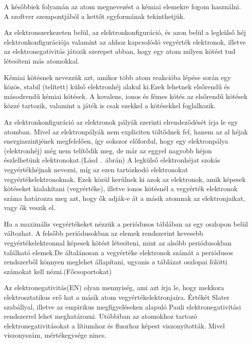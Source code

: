\documentclass[colorlinks]{thesis-ekf}
\theoremstyle{definition}
\theoremstyle{remark}
\begin{document}
A későbbiek folyamán az atom megnevezést a kémiai elemekre fogom használni. A szoftver szempontjából a kettőt egyformának tekinthetjük.

Az elektronszerkezeten belül, az elektronkonfiguráció, és azon belül a legkülső héj elektronkonfigurációja valamint az ahhoz kapcsolódó vegyérték elektronok, illetve az elektronegativitás játszik szerepet abban, hogy egy atom milyen kötést tud létesíteni más atomokkal. 

Kémiai kötésnek nevezzük azt, amikor több atom reakcióba lépése során egy közös, stabil (telített) külső elektronhéj alakul ki.Ezek lehetnek elsőrendű és másodrendű kémiai kötések. A kovalens, ionos és fémes kötés az elsőrendű kötések közzé tartozik\cite{miskolc_kemia}, valamint a játék is csak ezekkel a kötésekkel foglalkozik.

Az elektronkonfiguráció az elektronok pályák szerinti elrendeződését írja le egy atomban.\cite{periodusos_ppt} Mivel az elektronpályák nem expliciten töltődnek fel, hanem az al héjak energiaszintjének megfelelően, így sokszor előfordul, hogy egy elektronpálya (elektronhéj) még nem telítődik meg, de már az eggyel nagyobb héjon észlelhetünk elektronokat.(Lásd .~ábrán)
A legkülső elektronhéjat szokás vegyértékhéjnak nevezni, míg az ezen tartózkodó elektronokat vegyértékelektronoknak.\cite{vegyérték_sulinet} Ezek közül kerülnek ki azok az elektronok, amik képesek kötéseket kialakítani (vegyértéke), illetve ionos kötésnél a vegyérték elektronok száma határozza meg azt, hogy ők adják-e át a másik atomnak az elektronjaikat, vagy ők veszik el.\cite{ionos_vidi}

Ha a maximális vegyértékeket nézzük a periódusos táblában az egy oszlopon belül változhat. A felsőbb periódusokban az elemek rendszerint kevesebb vegyértékelektronnal képesek kötést létesíteni, mint az alsóbb periódusokban található elemek.\cite{periodusos_ppt}De általánosan a vegyértéke elektronok számát a periódusos rendszerből könnyen meglehet állapítani, ugyanis a táblázat oszlopai fölötti számokat kell nézni.(Főcsoportokat) \cite{vegyérték_sulinet}

Az elektronegativitás(EN) olyan mennyiség, ami azt írja le, hogy mekkora elektrosztatikus erő hat a másik atom vegyértékelektronjaira.\cite{angol_en} Értékét Slater szabállyal, illetve az empirikus megfigyeléseken alapuló Pauli elektronegativitási rendszerrel lehet meghatározni. Utóbbiban az atomokhoz tartozó elektronegativitásokat a lítiumhoz és fluorhoz képest viszonyították. Mivel viszonyszám, mértékegysége nincs.\cite{miskolc_kemia}\cite{eke_kemia_ppt}
\end{document}
